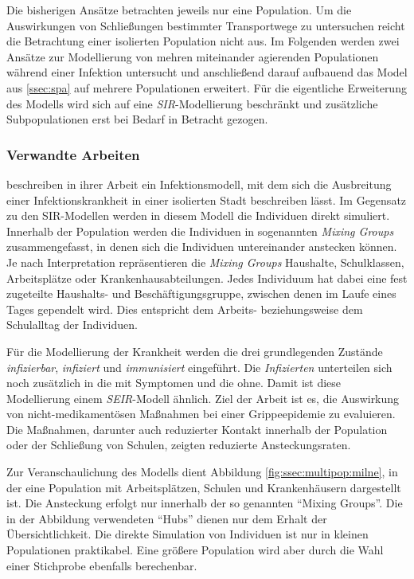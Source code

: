Die bisherigen Ansätze betrachten jeweils nur eine Population. Um die Auswirkungen von Schließungen bestimmter Transportwege zu untersuchen reicht die Betrachtung einer isolierten Population nicht aus. Im Folgenden werden zwei Ansätze zur Modellierung von mehren miteinander agierenden Populationen während einer Infektion untersucht und anschließend darauf aufbauend das Model aus \ref{ssec:spa} auf mehrere Populationen erweitert. Für die eigentliche Erweiterung des Modells wird sich auf eine \emph{SIR}-Modellierung beschränkt und zusätzliche Subpopulationen erst bei Bedarf in Betracht gezogen.
\subsubsection{Verwandte Arbeiten}
\steffen
\cite{Milne2008} beschreiben in ihrer Arbeit ein Infektionsmodell, mit dem sich die Ausbreitung einer Infektionskrankheit in einer isolierten Stadt beschreiben lässt. Im Gegensatz zu den SIR-Modellen werden in diesem Modell die Individuen direkt simuliert. Innerhalb der Population werden die Individuen in sogenannten \emph{Mixing Groups} zusammengefasst, in denen sich die Individuen untereinander anstecken können. Je nach Interpretation repräsentieren die \emph{Mixing Groups} Haushalte, Schulklassen, Arbeitsplätze oder Krankenhausabteilungen. Jedes Individuum hat dabei eine fest zugeteilte Haushalts- und Beschäftigungsgruppe, zwischen denen im Laufe eines Tages gependelt wird. Dies entspricht dem Arbeits- beziehungsweise dem Schulalltag der Individuen.

Für die Modellierung der Krankheit werden die drei grundlegenden Zustände \emph{infizierbar}, \emph{infiziert} und \emph{immunisiert} eingeführt. Die \emph{Infizierten} unterteilen sich noch zusätzlich in die mit Symptomen und die ohne. Damit ist diese Modellierung einem \emph{SEIR}-Modell ähnlich. Ziel der Arbeit ist es, die Auswirkung von nicht-medikamentösen Maßnahmen bei einer Grippeepidemie zu evaluieren. Die Maßnahmen, darunter auch reduzierter Kontakt innerhalb der Population oder der Schließung von Schulen, zeigten reduzierte Ansteckungsraten.

Zur Veranschaulichung des Modells dient Abbildung \ref{fig:ssec:multipop:milne}, in der eine Population mit Arbeitsplätzen, Schulen und Krankenhäusern dargestellt ist. Die Ansteckung erfolgt nur innerhalb der so genannten ``Mixing Groups''. Die in der Abbildung verwendeten ``Hubs'' dienen nur dem Erhalt der Übersichtlichkeit. Die direkte Simulation von Individuen ist nur in kleinen Populationen praktikabel. Eine größere Population wird aber durch die Wahl einer Stichprobe ebenfalls berechenbar.

